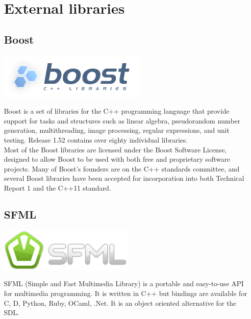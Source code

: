 \documentclass{scrreprt}
\begin{document}
					  \section{External libraries}
					  \subsection{Boost} %
					  \begin{center}
					  \includegraphics[scale=0.75]{Boost.png}
					  \end{center}
					  Boost is a set of libraries for the C++ programming language that provide support for tasks and structures such as linear algebra, pseudorandom number generation, multithreading, image processing, regular expressions, and unit testing. Release 1.52 contains over eighty individual libraries.\\

					  Most of the Boost libraries are licensed under the Boost Software License, designed to allow Boost to be used with both free and proprietary software projects. Many of Boost's founders are on the C++ standards committee, and several Boost libraries have been accepted for incorporation into both Technical Report 1 and the C++11 standard.

					  \subsection{SFML} %
					  \label{SFML}

					  \begin{center}
					  \includegraphics[scale=0.75]{SFML2.png}
					  \end{center}

					  SFML (Simple and Fast Multimedia Library) is a portable and easy-to-use API for multimedia programming. It is written in C++ but bindings are available for C, D, Python, Ruby, OCaml, .Net. It is an object oriented alternative for the SDL.\\
\end{document}
